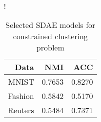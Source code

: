 \begin{table}[ht]
\caption{Selected SDAE models for constrained clustering problem}\label{tab:sdae-models}
\resizebox{\columnwidth}!{
\begin{tabular}{ | r | r | r |}
\hline
Data & NMI & ACC  \\ \hline 
MNIST & 0.7653 & 0.8270 \\ \hline 
Fashion & 0.5842 & 0.5170 \\ \hline 
Reuters & 0.5484 & 0.7371 \\ 
\hline
\end{tabular}
}
\end{table}